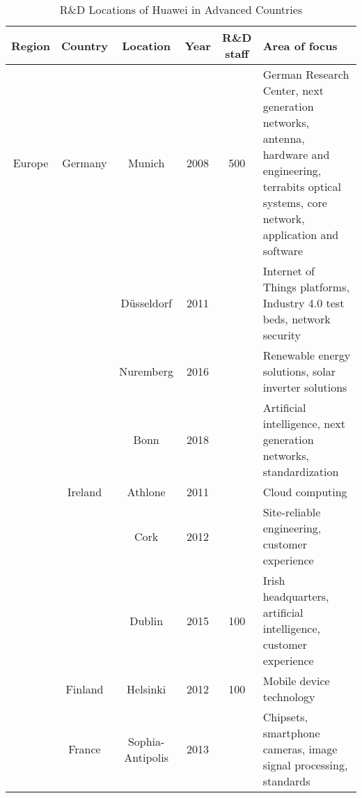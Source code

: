 \documentclass{book}
\begin{document}

\begin{sidewaystable}
	\caption{R\&D Locations of Huawei in Advanced Countries}
	
	\begin{tabularx}{1.0\textwidth}{cccccX}   %
	
		\hline
		
		
		Region 	& Country 	& Location 	& Year			& R\&D staff	& Area of focus \\
		
		
		\hline

		Europe & Germany	& Munich	& 2008			& 500			& German Research Center, next generation networks, antenna, hardware and engineering, terrabits optical systems, core network, application and software \\
		
				& 			& Düsseldorf & 2011			& 				& Internet of Things platforms, Industry 4.0 test beds, network security \\
							
				&			& Nuremberg	& 2016			& 				& Renewable energy solutions, solar inverter solutions \\		
					
				&			& Bonn		& 2018			& 				& Artificial intelligence, next generation networks, standardization \\
			
		\cline{2-6}
		
		
				& Ireland	& Athlone	& 2011			&				& Cloud computing \\
				
				&			& Cork		& 2012			& 				& Site-reliable engineering, customer experience \\
				
				& 			& Dublin	& 2015			& 100			& Irish headquarters, artificial intelligence, customer experience \\
				
				
		\cline{2-6}
		
		
				& Finland	& Helsinki	& 2012			& 100			& Mobile device technology \\
				
				
		\cline{2-6}
		
		
				& France	& Sophia-Antipolis	& 2013	& 				& Chipsets, smartphone cameras, image signal processing, standards \\
				

\end{tabularx}
\end{sidewaystable}
\end{document}
